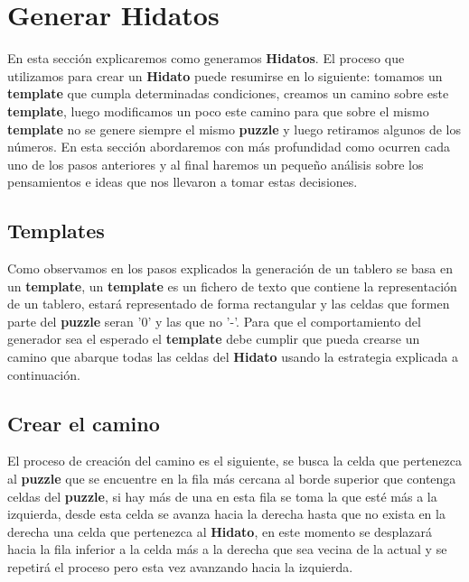 \documentclass[12pt]{article}
\begin{document}
\section{Generar Hidatos}
En esta secci\'on explicaremos como generamos {\bf Hidatos}. El proceso que utilizamos para crear un {\bf Hidato} puede resumirse en lo siguiente: tomamos un {\bf template} que cumpla
determinadas condiciones, creamos un camino sobre este {\bf template}, luego modificamos un poco este camino para que sobre el mismo {\bf template} no se genere siempre el mismo {\bf puzzle} y luego retiramos
algunos de los n\'umeros. En esta secci\'on abordaremos con m\'as profundidad como ocurren cada uno de los pasos anteriores y al final haremos un peque\~no an\'alisis sobre los pensamientos e ideas que nos llevaron 
a tomar estas decisiones.
\subsection{Templates}
Como observamos en los pasos explicados la generaci\'on de un tablero se basa en un {\bf template}, un {\bf template} es un fichero de texto que contiene la representaci\'on de un tablero, estar\'a representado de forma 
rectangular y las celdas que formen parte del {\bf puzzle} seran '0' y las que no '-'. Para que el comportamiento del generador sea el esperado el {\bf template} debe cumplir que pueda crearse un camino que abarque todas las 
celdas del {\bf Hidato} usando la estrategia explicada a continuaci\'on.
\subsection{Crear el camino}
El proceso de creaci\'on del camino es el siguiente, se busca la celda que pertenezca al {\bf puzzle} que se encuentre en la fila m\'as cercana al borde superior que contenga celdas del {\bf puzzle}, si hay m\'as de una en esta fila se toma la que 
est\'e m\'as a la izquierda, desde esta celda se avanza hacia la derecha hasta que no exista en la derecha una celda que pertenezca al {\bf Hidato}, en este momento se desplazar\'a hacia la fila inferior a la celda m\'as a la derecha
que sea vecina de la actual y se repetir\'a el proceso pero esta vez avanzando hacia la izquierda.
\end{document}
